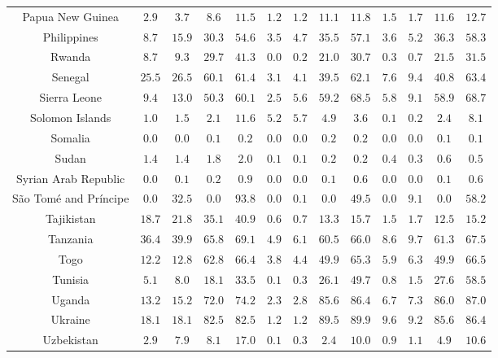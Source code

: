 \begin{longtable}{ccccccccccccc}
Papua New Guinea & $2.9$ & $3.7$ & $8.6$ & $11.5$ & $1.2$ & $1.2$ & $11.1$ & $11.8$ & $1.5$ & $1.7$ & $11.6$ & $12.7$ \\ 
Philippines & $8.7$ & $15.9$ & $30.3$ & $54.6$ & $3.5$ & $4.7$ & $35.5$ & $57.1$ & $3.6$ & $5.2$ & $36.3$ & $58.3$ \\ 
Rwanda & $8.7$ & $9.3$ & $29.7$ & $41.3$ & $0.0$ & $0.2$ & $21.0$ & $30.7$ & $0.3$ & $0.7$ & $21.5$ & $31.5$ \\ 
Senegal & $25.5$ & $26.5$ & $60.1$ & $61.4$ & $3.1$ & $4.1$ & $39.5$ & $62.1$ & $7.6$ & $9.4$ & $40.8$ & $63.4$ \\ 
Sierra Leone & $9.4$ & $13.0$ & $50.3$ & $60.1$ & $2.5$ & $5.6$ & $59.2$ & $68.5$ & $5.8$ & $9.1$ & $58.9$ & $68.7$ \\ 
Solomon Islands & $1.0$ & $1.5$ & $2.1$ & $11.6$ & $5.2$ & $5.7$ & $4.9$ & $3.6$ & $0.1$ & $0.2$ & $2.4$ & $8.1$ \\ 
Somalia & $0.0$ & $0.0$ & $0.1$ & $0.2$ & $0.0$ & $0.0$ & $0.2$ & $0.2$ & $0.0$ & $0.0$ & $0.1$ & $0.1$ \\ 
Sudan & $1.4$ & $1.4$ & $1.8$ & $2.0$ & $0.1$ & $0.1$ & $0.2$ & $0.2$ & $0.4$ & $0.3$ & $0.6$ & $0.5$ \\ 
Syrian Arab Republic & $0.0$ & $0.1$ & $0.2$ & $0.9$ & $0.0$ & $0.0$ & $0.1$ & $0.6$ & $0.0$ & $0.0$ & $0.1$ & $0.6$ \\ 
São Tomé and Príncipe & $0.0$ & $32.5$ & $0.0$ & $93.8$ & $0.0$ & $0.1$ & $0.0$ & $49.5$ & $0.0$ & $9.1$ & $0.0$ & $58.2$ \\ 
Tajikistan & $18.7$ & $21.8$ & $35.1$ & $40.9$ & $0.6$ & $0.7$ & $13.3$ & $15.7$ & $1.5$ & $1.7$ & $12.5$ & $15.2$ \\ 
Tanzania & $36.4$ & $39.9$ & $65.8$ & $69.1$ & $4.9$ & $6.1$ & $60.5$ & $66.0$ & $8.6$ & $9.7$ & $61.3$ & $67.5$ \\ 
Togo & $12.2$ & $12.8$ & $62.8$ & $66.4$ & $3.8$ & $4.4$ & $49.9$ & $65.3$ & $5.9$ & $6.3$ & $49.9$ & $66.5$ \\ 
Tunisia & $5.1$ & $8.0$ & $18.1$ & $33.5$ & $0.1$ & $0.3$ & $26.1$ & $49.7$ & $0.8$ & $1.5$ & $27.6$ & $58.5$ \\ 
Uganda & $13.2$ & $15.2$ & $72.0$ & $74.2$ & $2.3$ & $2.8$ & $85.6$ & $86.4$ & $6.7$ & $7.3$ & $86.0$ & $87.0$ \\ 
Ukraine & $18.1$ & $18.1$ & $82.5$ & $82.5$ & $1.2$ & $1.2$ & $89.5$ & $89.9$ & $9.6$ & $9.2$ & $85.6$ & $86.4$ \\ 
Uzbekistan & $2.9$ & $7.9$ & $8.1$ & $17.0$ & $0.1$ & $0.3$ & $2.4$ & $10.0$ & $0.9$ & $1.1$ & $4.9$ & $10.6$ \\ 

\end{longtable}
